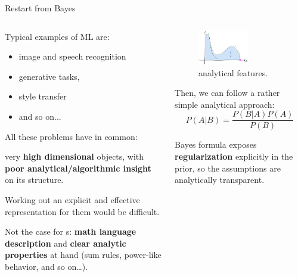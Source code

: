 \documentclass[9pt]{beamer}
\begin{document}
\begin{frame}{Restart from Bayes}
    \begin{columns}
        \begin{column}{0.5\textwidth}
            Typical examples of ML are:
            \begin{itemize}
                \item image and speech recognition
                \item generative tasks,
                \item style transfer
                \item and so on...
            \end{itemize}
            \vspace*{10pt}

            All these problems have in common:
            \begin{center}
                very \textbf{high dimensional} objects, with
                \alert{\textbf{poor analytical/algorithmic insight}} on its
                structure.   
            \end{center}
            Working out an explicit and effective representation for them would
            be difficult.
            \vspace*{10pt}

            Not the case for \pdf{}s: \textbf{math language description} and
            \textbf{clear analytic properties} at hand (sum rules, power-like
            behavior, and so on\dots).
        \end{column}
        \begin{column}{0.5\textwidth}
            \begin{figure}
                \centering
                \includegraphics[width=0.6\textwidth]{pdf}
                \caption{\pdf analytical features.}
            \end{figure}

            Then, we can follow a rather simple analytical approach:
            \begin{equation*}
                P(A|B) = \frac{P(B|A) P(A)}{P(B)}
            \end{equation*}
            
            Bayes formula exposes \textbf{regularization} explicitly in the
            prior, so the assumptions are analytically transparent.
        \end{column}
    \end{columns}
\end{frame}
\end{document}
